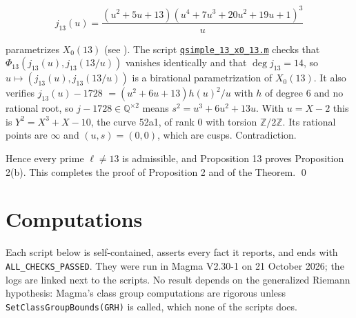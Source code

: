 \documentclass[11pt]{article}
\newcommand{\Q}{\mathbb Q}
\newcommand{\Z}{\mathbb Z}
\begin{document}
\begin{itemize}
\[
j_{13}(u)=\frac{(u^2+5u+13)(u^4+7u^3+20u^2+19u+1)^3}{u}
\]

parametrizes \(X_0(13)\) (see \cite[§3.3]{Vuk}). The script \href{https://genus-2-torsion.github.io/data/knowledge/sources/qsimple_13_x0_13.m}{\texttt{qsimple\_\allowbreak{}13\_\allowbreak{}x0\_\allowbreak{}13.m}} checks
          that \(\Phi_{13}(j_{13}(u),j_{13}(13/u))\) vanishes identically and that \(\deg j_{13}=14\), so
          \(u\mapsto(j_{13}(u),j_{13}(13/u))\) is a birational parametrization of \(X_0(13)\). It also verifies
          \(j_{13}(u)-1728\) \({}=(u^2+6u+13)h(u)^2/u\) with \(h\) of degree \(6\) and no rational root, so
          \(j-1728\in\Q^{\times2}\) means \(s^2=u^3+6u^2+13u\). With \(u=X-2\) this is \(Y^2=X^3+X-10\), the curve
          52a1, of rank \(0\) with torsion \(\Z/2\Z\). Its rational points are \(\infty\) and \((u,s)=(0,0)\), which
          are cusps. Contradiction.
\end{itemize}

Hence every prime \(\ell\neq13\) is admissible, and Proposition 13 proves Proposition 2(b). This
      completes the proof of Proposition 2 and of the Theorem. \qed

\section{Computations}\label{computations}

Each script below is self-contained, asserts every fact it reports, and ends with
      \texttt{ALL\_CHECKS\_PASSED}. They were run in Magma V2.30-1 on 21 October 2026; the logs are
      linked next to the scripts. No result depends on the generalized Riemann hypothesis: Magma's
      class group computations are rigorous unless \texttt{SetClassGroupBounds({}GRH{})} is called,
      which none of the scripts does.
\end{document}
